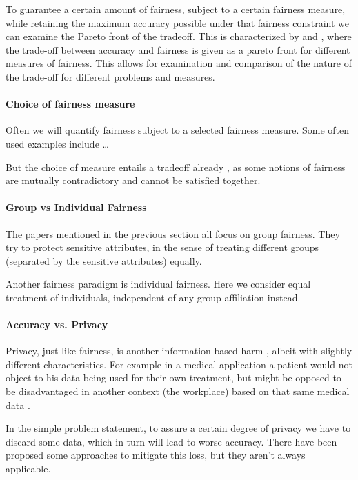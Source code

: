 	To guarantee a certain amount of fairness, subject to a certain fairness measure, while retaining the maximum accuracy possible under that fairness constraint we can examine the Pareto front of the tradeoff. 	
	This is characterized by \cite{liu2020accuracy} and \cite{wei2020fairness}, where the trade-off between accuracy and fairness is given as a pareto front for different measures of fairness.
	This allows for examination and comparison of the nature of the trade-off for different problems and measures.

	\paragraph{Choice of fairness measure}
	Often we will quantify fairness subject to a selected fairness measure.
	Some often used examples include \dots

	But the choice of measure entails a tradeoff already \cite{chouldechova2017fair}\cite{kleinberg2016inherent}, as some notions of fairness are mutually contradictory and cannot be satisfied together.


	\paragraph{Group vs Individual Fairness}
	The papers mentioned in the previous section all focus on group fairness.
	They try to protect sensitive attributes, in the sense of treating different groups (separated by the sensitive attributes) equally.

	Another fairness paradigm is individual fairness.
	Here we consider equal treatment of individuals, independent of any group affiliation instead.
	
	\paragraph{Accuracy vs. Privacy}
	Privacy, just like fairness, is another information-based harm \cite{van2008information}, albeit with slightly different characteristics.
	For example in a medical application a patient would not object to his data being used for their own treatment, but might be opposed to be disadvantaged in another context (\eg the workplace) based on that same medical data \cite{van2008information}.

	In the simple problem statement, to assure a certain degree of privacy we have to discard some data, which in turn will lead to worse accuracy.
	There have been proposed some approaches to mitigate this loss, but they aren't always applicable.




